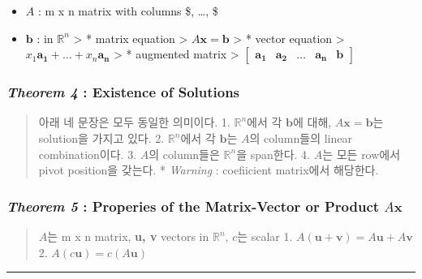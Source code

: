 \documentclass[11pt]{article}
\providecommand{\tightlist}{%
      \setlength{\itemsep}{0pt}\setlength{\parskip}{0pt}}
\begin{document}
\begin{itemize}
\tightlist
\item
  \(A\) : m x n matrix with columns \$, \dots,
   \$
\item
  \(\mathbf{b}\) : in \(\mathbb{R}^n\) \textgreater{} * matrix equation
  \textgreater{} \(A\mathbf{x} = \mathbf{b}\) \textgreater{} * vector
  equation \textgreater{}
  \(x_{1}\mathbf{a_{1}} + \dots + x_{n}\mathbf{a_{n}}\) \textgreater{} *
  augmented matrix \textgreater{}
  \(\begin{bmatrix} \mathbf{a_{1}} & \mathbf{a_{2}} & \dots & \mathbf{a_{n}} & \mathbf{b} \end{bmatrix}\)
\end{itemize}

\hypertarget{theorem-4-existence-of-solutions}{%
\subsubsection{\texorpdfstring{\emph{Theorem 4} : Existence of
Solutions}{Theorem 4 : Existence of Solutions}}\label{theorem-4-existence-of-solutions}}

\begin{quote}
아래 네 문장은 모두 동일한 의미이다. 1. \(\mathbb{R}^n\)에서 각
\(\mathbf{b}\)에 대해, \(A\mathbf{x} = \mathbf{b}\)는 solution을 가지고
있다. 2. \(\mathbb{R}^n\)에서 각 \(\mathbf{b}\)는 \(A\)의 column들의
linear combination이다. 3. \(A\)의 column들은 \(\mathbb{R}^n\)을
span한다. 4. \(A\)는 모든 row에서 pivot position을 갖는다. *
\emph{Warning} : coefiicient matrix에서 해당한다.
\end{quote}

\hypertarget{theorem-5-properies-of-the-matrix-vector-or-product-amathbfx}{%
\subsubsection{\texorpdfstring{\emph{Theorem 5} : Properies of the
Matrix-Vector or Product
\(A\mathbf{x}\)}{Theorem 5 : Properies of the Matrix-Vector or Product A\textbackslash{}mathbf\{x\}}}\label{theorem-5-properies-of-the-matrix-vector-or-product-amathbfx}}

\begin{quote}
\(A\)는 m x n matrix, \textbf{u, v} vectors in \(\mathbb{R}^n\), \(c\)는
scalar 1. \(A(\mathbf{u} + \mathbf{v}) = A\mathbf{u} + A\mathbf{v}\) 2.
\(A(c\mathbf{u}) = c(A\mathbf{u})\)
\end{quote}

    \begin{center}\rule{0.5\linewidth}{\linethickness}\end{center}
\end{document}

